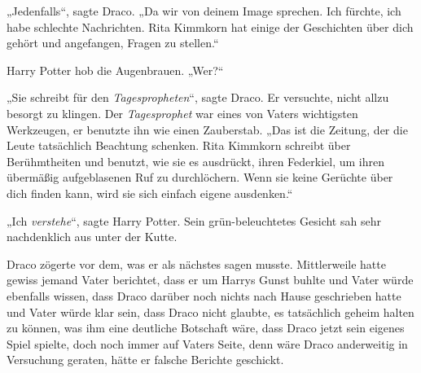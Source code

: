 „Jedenfalls“, sagte Draco.
„Da wir von deinem Image sprechen. Ich fürchte, ich habe schlechte Nachrichten. Rita Kimmkorn hat einige der Geschichten über dich gehört und angefangen, Fragen zu stellen.“

Harry Potter hob die Augenbrauen.
„Wer?“

„Sie schreibt für den \emph{Tagespropheten}“, sagte Draco. Er versuchte, nicht allzu besorgt zu klingen. Der \emph{Tagesprophet} war eines von Vaters wichtigsten Werkzeugen, er benutzte ihn wie einen Zauberstab.
„Das ist die Zeitung, der die Leute tatsächlich Beachtung schenken. Rita Kimmkorn schreibt über Berühmtheiten und benutzt, wie sie es ausdrückt, ihren Federkiel, um ihren übermäßig aufgeblasenen Ruf zu durchlöchern. Wenn sie keine Gerüchte über dich finden kann, wird sie sich einfach eigene ausdenken.“

„Ich \emph{verstehe}“, sagte Harry Potter. Sein grün-beleuchtetes Gesicht sah sehr nachdenklich aus unter der Kutte.

Draco zögerte vor dem, was er als nächstes sagen musste. Mittlerweile hatte gewiss jemand Vater berichtet, dass er um Harrys Gunst buhlte und Vater würde ebenfalls wissen, dass Draco darüber noch nichts nach Hause geschrieben hatte und Vater würde klar sein, dass Draco nicht glaubte, es tatsächlich geheim halten zu können, was ihm eine deutliche Botschaft wäre, dass Draco jetzt sein eigenes Spiel spielte, doch noch immer auf Vaters Seite, denn wäre Draco anderweitig in Versuchung geraten, hätte er falsche Berichte geschickt.

